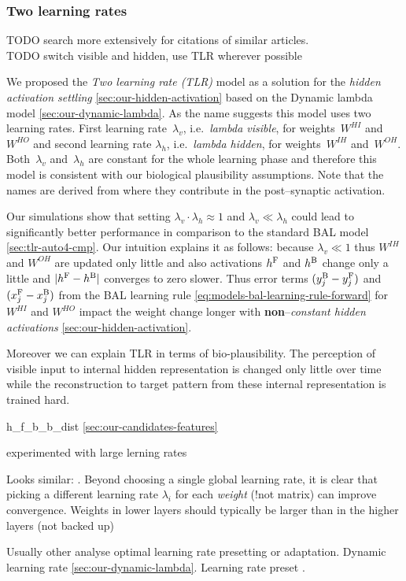 
\subsubsection{Two learning rates} 
\label{sec:our-tlr}

TODO search more extensively for citations of similar articles. \\
TODO switch visible and hidden, use TLR wherever possible 


We proposed the \emph{Two learning rate (TLR)} model as a solution for the \emph{hidden activation settling} \ref{sec:our-hidden-activation} based on the Dynamic lambda model \ref{sec:our-dynamic-lambda}. As the name suggests this model uses two learning rates. First learning rate~$\lambda_v$, i.e.~\emph{lambda visible}, for weights~$W^{HI}$ and~$W^{HO}$ and second learning rate $\lambda_h$, i.e.~\emph{lambda hidden}, for weights~$W^{IH}$ and~$W^{OH}$. Both~$\lambda_v$ and~$\lambda_h$ are constant for the whole learning phase and therefore this model is consistent with our biological plausibility assumptions. Note that the names are derived from where they contribute in the post--synaptic activation. 

Our simulations show that setting $\lambda_v \cdot \lambda_h \approx 1$ and $\lambda_v \ll \lambda_h$ could lead to significantly better performance in comparison to the standard BAL model \ref{sec:tlr-auto4-cmp}. Our intuition explains it as follows: because $\lambda_v \ll 1$ thus $W^{IH}$ and $W^{OH}$ are updated only little and also activations $h^{\rm F}$ and $h^{\rm B}$ change only a little and $|h^{\rm F}- h^{\rm B}|$ converges to zero slower. Thus error terms $(y_j^{\rm B} - y_j^{\rm F})$ and $(x_j^{\rm F} - x_j^{\rm B})$ from the BAL learning rule \ref{eq:models-bal-learning-rule-forward} for $W^{HI}$ and $W^{HO}$ impact the weight change longer with {\bf non}--\emph{constant hidden activations} \ref{sec:our-hidden-activation}. 

Moreover we can explain TLR in terms of bio-plausibility. The perception of visible input to internal hidden representation is changed only little over time while the reconstruction to target pattern from these internal representation is trained hard. 

h\_f\_b\_b\_dist \ref{sec:our-candidates-features}

\citet{cater1987successfully} experimented with large lerning rates 

Looks similar: \citet{lecun2012efficient}. Beyond choosing a single global learning rate, it is clear that picking a different learning rate $\lambda_i$ for each \emph{weight} (!not matrix) can improve convergence. 
Weights in lower layers should typically be larger than in the higher layers (not backed up) 

Usually other analyse optimal learning rate presetting or adaptation. 
Dynamic learning rate \ref{sec:our-dynamic-lambda}. 
Learning rate preset \citep{darken1992learning}.


